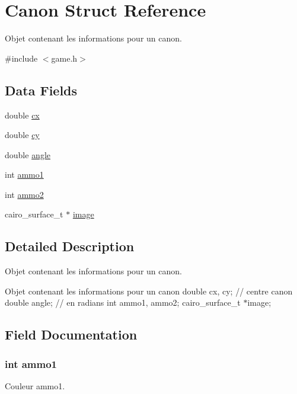 \hypertarget{struct_canon}{}\section{Canon Struct Reference}
\label{struct_canon}


Objet contenant les informations pour un canon.  




{\ttfamily \#include $<$game.\+h$>$}

\subsection*{Data Fields}
\begin{DoxyCompactItemize}
\item 
double \hyperlink{struct_canon_ac176cb816ac192bd8ec2f73c40b43309}{cx}
\item 
double \hyperlink{struct_canon_a2d6a093e4a6fe06658d3d01563d028c9}{cy}
\item 
double \hyperlink{struct_canon_a79dea7ed146af26ff4a0ba4bf5c83eee}{angle}
\item 
int \hyperlink{struct_canon_aa7d15d38483030248f99f85470cd296c}{ammo1}
\item 
int \hyperlink{struct_canon_a4126da3ee54341be6c362c00abc4dd76}{ammo2}
\item 
cairo\+\_\+surface\+\_\+t $\ast$ \hyperlink{struct_canon_a4d3180badf477a42a7f55128b348f141}{image}
\end{DoxyCompactItemize}


\subsection{Detailed Description}
Objet contenant les informations pour un canon. 

Objet contenant les informations pour un canon double cx, cy; // centre canon double angle; // en radians int ammo1, ammo2; cairo\+\_\+surface\+\_\+t $\ast$image; 

\subsection{Field Documentation}
\subsubsection[{\texorpdfstring{ammo1}{ammo1}}]{\setlength{\rightskip}{0pt plus 5cm}int ammo1}\hypertarget{struct_canon_aa7d15d38483030248f99f85470cd296c}{}\label{struct_canon_aa7d15d38483030248f99f85470cd296c}
Couleur ammo1. 
